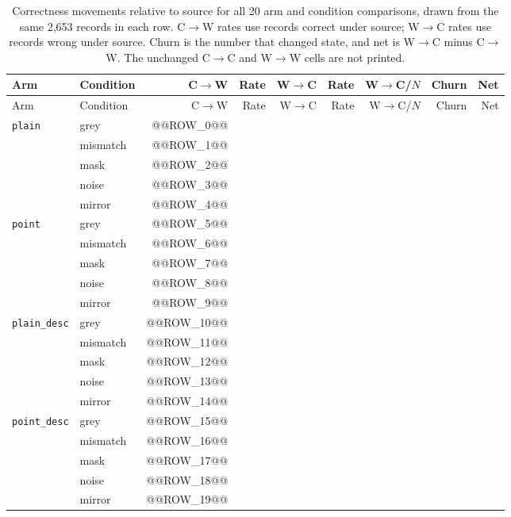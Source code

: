 \begin{longtable}{llrrrrrrr}
\caption[Stage~1 correctness movements in every arm and condition]{Correctness
movements relative to source for all 20 arm and condition comparisons, drawn
from the same 2,653 records in each row. C$\rightarrow$W rates use records
correct under source; W$\rightarrow$C rates use records wrong under source.
Churn is the number that changed state, and net is W$\rightarrow$C minus
C$\rightarrow$W. The unchanged C$\rightarrow$C and W$\rightarrow$W cells are not
printed.}\label{tab:app-rq1-transitions}\\
\toprule
Arm & Condition & C$\rightarrow$W & Rate & W$\rightarrow$C & Rate & W$\rightarrow$C/$N$ & Churn & Net \\
\midrule
\endfirsthead
\toprule
Arm & Condition & C$\rightarrow$W & Rate & W$\rightarrow$C & Rate & W$\rightarrow$C/$N$ & Churn & Net \\
\midrule
\endhead
\texttt{plain} & grey & @@ROW_0@@ \\
 & mismatch & @@ROW_1@@ \\
 & mask & @@ROW_2@@ \\
 & noise & @@ROW_3@@ \\
 & mirror & @@ROW_4@@ \\
\texttt{point} & grey & @@ROW_5@@ \\
 & mismatch & @@ROW_6@@ \\
 & mask & @@ROW_7@@ \\
 & noise & @@ROW_8@@ \\
 & mirror & @@ROW_9@@ \\
\texttt{plain\_desc} & grey & @@ROW_10@@ \\
 & mismatch & @@ROW_11@@ \\
 & mask & @@ROW_12@@ \\
 & noise & @@ROW_13@@ \\
 & mirror & @@ROW_14@@ \\
\texttt{point\_desc} & grey & @@ROW_15@@ \\
 & mismatch & @@ROW_16@@ \\
 & mask & @@ROW_17@@ \\
 & noise & @@ROW_18@@ \\
 & mirror & @@ROW_19@@ \\
\bottomrule
\end{longtable}

